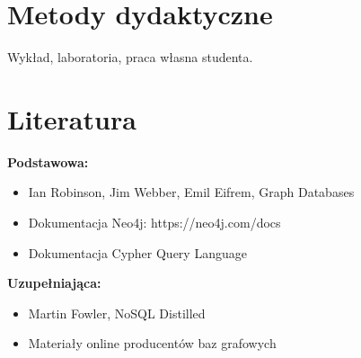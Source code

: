 \documentclass[12pt, a4paper]{article}
\begin{document}
\section{Metody dydaktyczne}

Wykład, laboratoria, praca własna studenta.

\section{Literatura}

\textbf{Podstawowa:}
\begin{itemize}
  \item Ian Robinson, Jim Webber, Emil Eifrem, Graph Databases
  \item Dokumentacja Neo4j: https://neo4j.com/docs
  \item Dokumentacja Cypher Query Language
\end{itemize}

\textbf{Uzupełniająca:}
\begin{itemize}
  \item Martin Fowler, NoSQL Distilled
  \item Materiały online producentów baz grafowych
\end{itemize}
\end{document}
